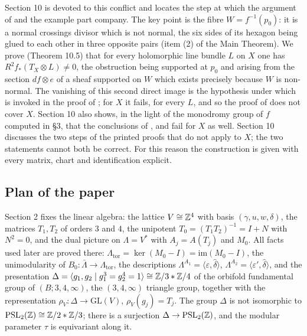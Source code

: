 Section 10 is devoted to this conflict and locates the step at which the argument of \cite{CDP20} and the example part company. The key point is the fibre $W = f^{-1}(p_0)$: it is a normal crossings divisor which is not normal, the six sides of its hexagon being glued to each other in three opposite pairs (item (2) of the Main Theorem). We prove (Theorem 10.5) that for every holomorphic line bundle $L$ on $X$ one has $R^2 f_*(T_X \otimes L) \ne 0$, the obstruction being supported at $p_0$ and arising from the section $df \otimes e$ of a sheaf supported on $W$ which exists precisely because $W$ is non-normal. The vanishing of this second direct image is the hypothesis under which \cite[Prop.\ 2.4]{CDP20} is invoked in the proof of \cite[Thm.\ 2.2]{CDP20}; for $X$ it fails, for every $L$, and so the proof of \cite[Thm.\ 2.2]{CDP20} does not cover $X$. Section 10 also shows, in the light of the monodromy group of $f$ computed in \S3, that the conclusions of \cite[Lemma 4.2]{CDP20}, \cite[Cor.\ 5.2]{CDP20} and \cite[Prop.\ 5.5]{CDP20} fail for $X$ as well. Section 10 discusses the two steps of the printed proofs that do not apply to $X$; the two statements cannot both be correct. For this reason the construction is given with every matrix, chart and identification explicit.

\subsection{Plan of the paper}

Section 2 fixes the linear algebra: the lattice $V \cong \mathbb{Z}^4$ with basis $(\gamma,u,w,\delta)$, the matrices $T_1, T_2$ of orders $3$ and $4$, the unipotent $T_0 = (T_1T_2)^{-1} = I + N$ with $N^2 = 0$, and the dual picture on $\Lambda = V^*$ with $A_j = A(T_j)$ and $M_0$. All facts used later are proved there: $\Lambda_{\mathrm{tor}} = \ker(M_0 - I) = \mathrm{im}(M_0-I)$, the unimodularity of $B_0\colon \bar\Lambda \to \Lambda_{\mathrm{tor}}$, the descriptions $\Lambda^{A_1} = \langle \varepsilon,\hat\delta\rangle$, $\Lambda^{A_2} = \langle \varepsilon',\hat\delta\rangle$, and the presentation $\Delta = \langle g_1,g_2 \mid g_1^3 = g_2^4 = 1\rangle \cong \mathbb{Z}/3 * \mathbb{Z}/4$ of the orbifold fundamental group of $(B;3,4,\infty)$, the $(3,4,\infty)$ triangle group, together with the representation $\rho_V\colon \Delta \to \mathrm{GL}(V)$, $\rho_V(g_j) = T_j$. The group $\Delta$ is not isomorphic to $\mathrm{PSL}_2(\mathbb{Z}) \cong \mathbb{Z}/2 * \mathbb{Z}/3$; there is a surjection $\Delta \to \mathrm{PSL}_2(\mathbb{Z})$, and the modular parameter $\tau$ is equivariant along it.

